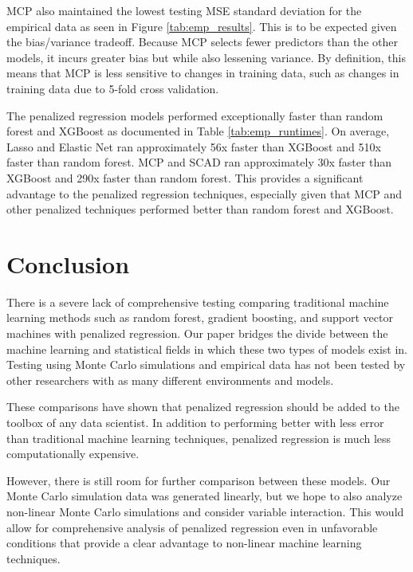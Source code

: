 \documentclass{article}
\begin{document}
MCP also maintained the lowest testing MSE standard deviation for the empirical data as seen in Figure \ref{tab:emp_results}. This is to be expected given the bias/variance tradeoff. Because MCP selects fewer predictors than the other models, it incurs greater bias but while also lessening variance. By definition, this means that MCP is less sensitive to changes in training data, such as changes in training data due to 5-fold cross validation. 

The penalized regression models performed exceptionally faster than random forest and XGBoost as documented in Table \ref{tab:emp_runtimes}. On average, Lasso and Elastic Net ran approximately 56x faster than XGBoost and 510x faster than random forest. MCP and SCAD ran approximately 30x faster than XGBoost and 290x faster than random forest. This provides a significant advantage to the penalized regression techniques, especially given that MCP and other penalized techniques performed better than random forest and XGBoost. 


\section{Conclusion}\label{sec:conclusion}

There is a severe lack of comprehensive testing comparing traditional machine learning methods such as random forest, gradient boosting, and support vector machines with penalized regression. Our paper bridges the divide between the machine learning and statistical fields in which these two types of models exist in. Testing using Monte Carlo simulations and empirical data has not been tested by other researchers with as many different environments and models.

These comparisons have shown that penalized regression should be added to the toolbox of any data scientist. In addition to performing better with less error than traditional machine learning techniques, penalized regression is much less computationally expensive.

However, there is still room for further comparison between these models. Our Monte Carlo simulation data was generated linearly, but we hope to also analyze non-linear Monte Carlo simulations and consider variable interaction. This would allow for comprehensive analysis of penalized regression even in unfavorable conditions that provide a clear advantage to non-linear machine learning techniques. 
\end{document}
